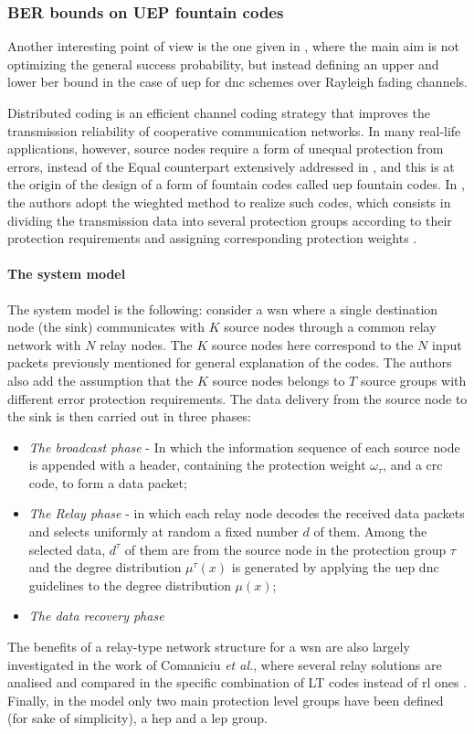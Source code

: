 \subsubsection{BER bounds on UEP fountain codes}
Another interesting point of view is the one given in \cite{Yue2014}, where the main aim is not optimizing the general success probability, but instead defining an upper and lower \gls{ber} bound in the case of \gls{uep} for \gls{dnc} schemes over Rayleigh fading channels.

Distributed coding is an efficient channel coding strategy that improves the transmission reliability of cooperative communication networks. In many real-life applications, however, source nodes require a form of unequal protection from errors, instead of the Equal counterpart extensively addressed in \cite{Pang2012}, and this is at the origin of the design of a form of fountain codes called \gls{uep} fountain codes. In \cite{Yue2014}, the authors adopt the wieghted method to realize such codes, which consists in dividing the transmission data into several protection groups according to their protection requirements and assigning corresponding protection weights \cite{Yue2014}.

\paragraph{The system model} \label{sec:relayBER}
The system model is the following: consider a \gls{wsn} where a single destination node (the sink) communicates with $K$ source nodes through a common relay network with $N$ relay nodes. The $K$ source nodes here correspond to the $N$ input packets previously mentioned for general explanation of the codes. The authors also add the assumption that the $K$ source nodes belongs to $T$ source groups with different error protection requirements. The data delivery from the source node to the sink is then carried out in three phases:
\begin{itemize}
  \item \textit{The broadcast phase} - In which the information sequence of each source node is appended with a header, containing the protection weight $\omega_\tau$, and a \gls{crc} code, to form a data packet;
  \item \textit{The Relay phase} - in which each relay node decodes the received data packets and selects uniformly at random a fixed number $d$ of them. Among the selected data, $d^\tau$ of them are from the source node in the protection group $\tau$ and the degree distribution $\mu^\tau(x)$ is generated by applying the \gls{uep} \gls{dnc} guidelines to the degree distribution $\mu(x)$;
  \item \textit{The data recovery phase}
\end{itemize}
The benefits of a relay-type network structure for a \gls{wsn} are also largely investigated in the work of Comaniciu \textit{et al.}, where several relay solutions are analised and compared in the specific combination of LT codes instead of \gls{rl} ones \cite{Comaniciu2011}.\\
Finally, in the model only two main protection level groups have been defined  (for sake of simplicity), a \gls{hep} and a \gls{lep} group.

